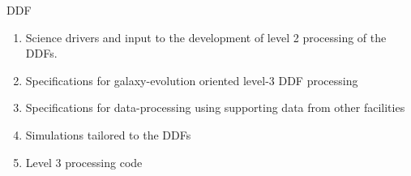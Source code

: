 \begin{tasklist}{DDF}
\begin{task}
{\begin{enumerate}
\item Science drivers and input to the development of level 2 processing of the DDFs.
\item Specifications for galaxy-evolution oriented level-3 DDF processing
\item Specifications for data-processing using supporting data from other facilities
\item Simulations tailored to the DDFs
\item Level 3 processing code 
\end{enumerate}
}
\end{task}

\end{tasklist}

  
